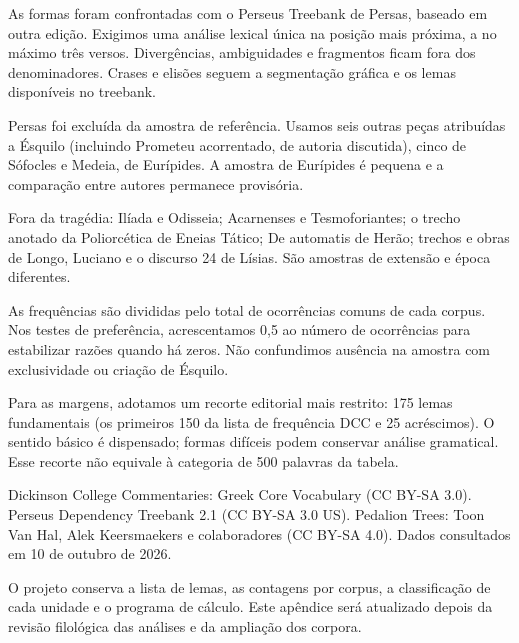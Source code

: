 \blank[2mm]
As formas foram confrontadas com o Perseus Treebank de Persas, baseado em outra edição. Exigimos uma análise lexical única na posição mais próxima, a no máximo três versos. Divergências, ambiguidades e fragmentos ficam fora dos denominadores. Crases e elisões seguem a segmentação gráfica e os lemas disponíveis no treebank.\par
{}\par
\blank[2mm]
Persas foi excluída da amostra de referência. Usamos seis outras peças atribuídas a Ésquilo (incluindo Prometeu acorrentado, de autoria discutida), cinco de Sófocles e Medeia, de Eurípides. A amostra de Eurípides é pequena e a comparação entre autores permanece provisória.\par
\blank[2mm]
Fora da tragédia: Ilíada e Odisseia; Acarnenses e Tesmoforiantes; o trecho anotado da Poliorcética de Eneias Tático; De automatis de Herão; trechos e obras de Longo, Luciano e o discurso 24 de Lísias. São amostras de extensão e época diferentes.\par
\blank[2mm]
As frequências são divididas pelo total de ocorrências comuns de cada corpus. Nos testes de preferência, acrescentamos 0,5 ao número de ocorrências para estabilizar razões quando há zeros. Não confundimos ausência na amostra com exclusividade ou criação de Ésquilo.\par
\blank[3mm]
Para as margens, adotamos um recorte editorial mais restrito: 175 lemas fundamentais (os primeiros 150 da lista de frequência DCC e 25 acréscimos). O sentido básico é dispensado; formas difíceis podem conservar análise gramatical. Esse recorte não equivale à categoria de 500 palavras da tabela.\par
{}\par
\blank[2mm]
Dickinson College Commentaries: Greek Core Vocabulary (CC BY-SA 3.0). Perseus Dependency Treebank 2.1 (CC BY-SA 3.0 US). Pedalion Trees: Toon Van Hal, Alek Keersmaekers e colaboradores (CC BY-SA 4.0). Dados consultados em 10 de outubro de 2026.\par
\blank[2mm]
O projeto conserva a lista de lemas, as contagens por corpus, a classificação de cada unidade e o programa de cálculo. Este apêndice será atualizado depois da revisão filológica das análises e da ampliação dos corpora.\par
